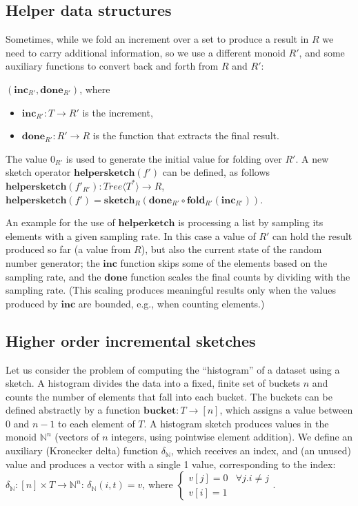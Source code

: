 \documentclass{article}
\newcommand{\tree}[1]{\mathit{Tree}\langle #1 \rangle}
\newcommand{\mr}[1]{\ensuremath{\mathrm{\mathbf{#1}}}}
\newcommand{\N}{\ensuremath{\mathbb{N}}\xspace}
\begin{document}
\subsection{Helper data structures}

Sometimes, while we fold an increment over a set to produce a result
in $R$ we need to carry additional information, so we use a different
monoid $R'$, and some auxiliary functions to convert back and forth
from $R$ and $R'$:

$(\mr{inc}_{R'}, \mr{done}_{R'})$, where

\begin{itemize}
\item $\mr{inc}_{R'}: T \rightarrow R'$ is the increment,
\item $\mr{done}_{R'}: R' \rightarrow R$ is the function that
  extracts the final result.
\end{itemize}

The value $0_{R'}$ is used to generate the initial value for folding
over $R'$.  A new sketch operator $\mr{helpersketch}(f')$ can be
defined, as follows $\mr{helpersketch}(f'_{R'}): \tree{T^*}
\rightarrow R$, $\mr{helpersketch}(f') = \mr{sketch}_R(\mr{done}_{R'}
\circ \mr{fold}_{R'}(\mr{inc}_{R'}))$.

An example for the use of $\mr{helperketch}$ is processing a list by
sampling its elements with a given sampling rate.  In this case a
value of $R'$ can hold the result produced so far (a value from $R$),
but also the current state of the random number generator; the
\mr{inc} function skips some of the elements based on the sampling
rate, and the \mr{done} function scales the final counts by dividing
with the sampling rate.  (This scaling produces meaningful results
only when the values produced by \mr{inc} are bounded, e.g., when
counting elements.)

\subsection{Higher order incremental sketches}

Let us consider the problem of computing the ``histogram'' of a
dataset using a sketch.  A histogram divides the data into a fixed,
finite set of buckets $n$ and counts the number of elements that fall
into each bucket.  The buckets can be defined abstractly by a function
$\mr{bucket}: T \rightarrow [n]$, which assigns a value between $0$
and $n-1$ to each element of $T$.  A histogram sketch produces values
in the monoid $\N^n$ (vectors of $n$ integers, using pointwise element
addition).  We define an auxiliary (Kronecker delta) function
$\delta_{\N}$, which receives an index, and (an unused) value and
produces a vector with a single 1 value, corresponding to the index:
$\delta_{\N}: [n] \times T \rightarrow \N^n$: $\delta_{\N}(i, t) = v$,
where $
\begin{cases}
  v[j] = 0 & \forall j.i \not= j \\
  v[i] = 1
\end{cases}$.
\end{document}
